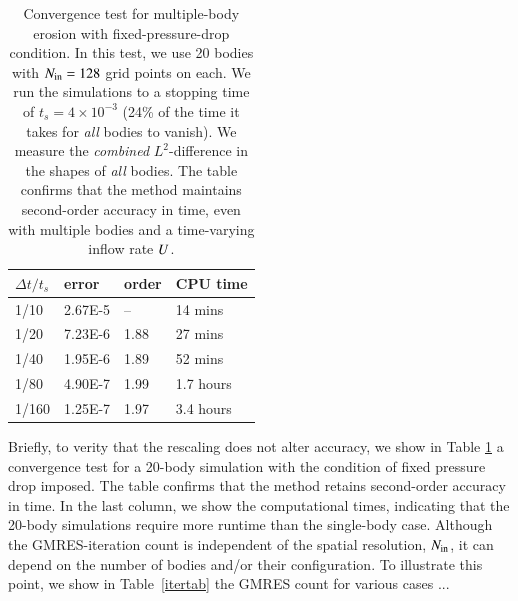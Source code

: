 \documentclass[preprint, 10pt]{elsarticle}
\begin{document}
\begin{table}%
\begin{center}
\caption{Convergence test for multiple-body erosion with fixed-pressure-drop condition. In this test, we use 20 bodies with $N_{\mathrm{in}} = 128$ grid points on each. We run the simulations to a stopping time of $t_s = 4 \times 10^{-3}$ (24\% of the time it takes for {\em all} bodies to vanish). We measure the {\em combined} $L^2$-difference in the shapes of {\em all} bodies. The table confirms that the method maintains second-order accuracy in time, even with multiple bodies and a time-varying inflow rate $U$.
}
\vspace{0.3 pc}
\label{convtab}
\begin{tabular}{l l l l}
\hline
\hspace{0.0pc} $\Delta t/t_s$
\hspace{0.5pc} & error 
\hspace{0.5pc} & order
\hspace{0.5pc} & CPU time \\
\hline
%
1/10     	& 2.67E-5  	& --        	& 14 mins  	\\
1/20     	& 7.23E-6  	& 1.88 	& 27 mins  	\\
1/40     	& 1.95E-6  	& 1.89 	& 52 mins  	\\
1/80     	& 4.90E-7  	& 1.99 	& 1.7 hours	\\
1/160     	& 1.25E-7  	& 1.97  	& 3.4 hours	\\
%
\hline
\end{tabular}
\end{center}
\end{table}

Briefly, to verity that the rescaling does not alter accuracy, we show in Table \ref{convtab} a convergence test for a 20-body simulation with the condition of fixed pressure drop imposed. The table confirms that the method retains second-order accuracy in time. In the last column, we show the computational times, indicating that the 20-body simulations require more runtime than the single-body case. Although the GMRES-iteration count is independent of the spatial resolution, $N_{\mathrm{in}}$, it can depend on the number of bodies and/or their configuration. To illustrate this point, we show in Table~\ref{itertab} the GMRES count for various cases ...
\end{document}

